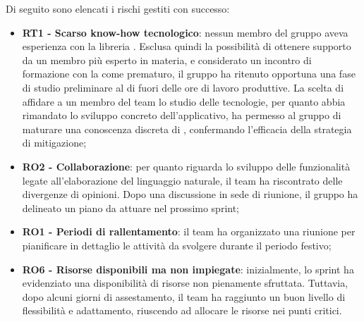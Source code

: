 \vspace{0.5\baselineskip}
\par Di seguito sono elencati i rischi gestiti con successo:
\begin{itemize}
  \item \textbf{RT1 - Scarso know-how tecnologico}: nessun membro del gruppo aveva esperienza con la libreria . Esclusa quindi la possibilità di ottenere supporto da un membro più esperto in materia, e considerato un incontro di formazione con la  come prematuro, il gruppo ha ritenuto opportuna una fase di studio preliminare al di fuori delle ore di lavoro produttive. La scelta di affidare a un membro del team lo studio delle tecnologie, per quanto abbia rimandato lo sviluppo concreto dell'applicativo, ha permesso al gruppo di maturare una conoscenza discreta di , confermando l'efficacia della strategia di mitigazione;
  \item \textbf{RO2 - Collaborazione}: per quanto riguarda lo sviluppo delle funzionalità legate all’elaborazione del linguaggio naturale, il team ha riscontrato delle divergenze di opinioni. Dopo una discussione in sede di riunione, il gruppo ha delineato un piano da attuare nel prossimo sprint;
  \item \textbf{RO1 - Periodi di rallentamento}: il team ha organizzato una riunione per pianificare in dettaglio le attività da svolgere durante il periodo festivo;
  \item \textbf{RO6 - Risorse disponibili ma non impiegate}: inizialmente, lo sprint ha evidenziato una disponibilità di risorse non pienamente sfruttata. Tuttavia, dopo alcuni giorni di assestamento, il team ha raggiunto un buon livello di flessibilità e adattamento, riuscendo ad allocare le risorse nei punti critici.
\end{itemize}


